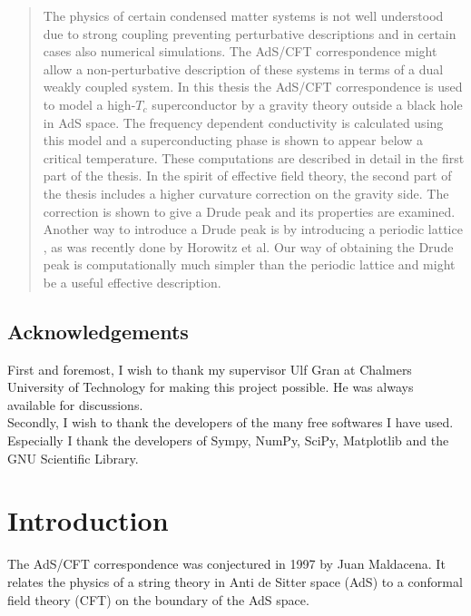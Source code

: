 \documentclass[12pt]{report}
\begin{document}
\begin{abstract}
The physics of certain condensed matter systems is not well understood due to strong coupling preventing perturbative descriptions and in certain cases also numerical simulations.
The AdS/CFT correspondence might allow a non-perturbative description of these systems in terms of a dual weakly coupled system. In this thesis the AdS/CFT correspondence is used to model a high-$T_c$ superconductor by a gravity theory outside a black hole in AdS space. The frequency dependent conductivity is calculated using this model and a superconducting phase is shown to appear below a critical temperature.
These computations are described in detail in the first part of the thesis. 
In the spirit of effective field theory, the second part of the thesis includes a higher curvature correction on the gravity side.
The correction is shown to give a Drude peak and its properties are examined.
Another way to introduce a Drude peak is by introducing a periodic lattice \cite{horowitz}, as was recently done by Horowitz et al. Our way of obtaining the Drude peak is computationally much simpler than the periodic lattice and might be a useful effective description.
\end{abstract}

\section*{Acknowledgements}
First and foremost, I wish to thank my supervisor Ulf Gran at Chalmers University of Technology for making this project possible. He was always available for discussions.\\

Secondly, I wish to thank the developers of the many free softwares I have used. Especially I thank the developers of Sympy, NumPy, SciPy, Matplotlib and the GNU Scientific Library.


\tableofcontents
\chapter{Introduction}
The AdS/CFT correspondence was conjectured in 1997 by Juan Maldacena. It relates the physics of a string theory in Anti de Sitter space (AdS) to a conformal field theory (CFT) on the boundary of the AdS space.\\
\end{document}
